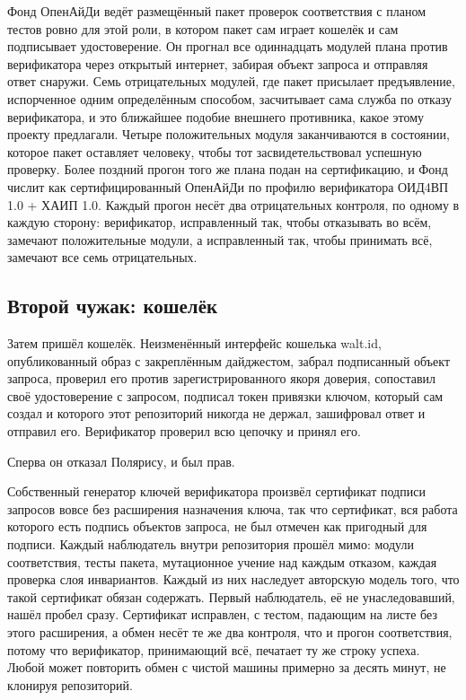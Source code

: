 Фонд ОпенАйДи ведёт размещённый пакет проверок соответствия с планом тестов ровно для этой роли, в
котором пакет сам играет кошелёк и сам подписывает удостоверение. Он прогнал все одиннадцать модулей
плана против верификатора через открытый интернет, забирая объект запроса и отправляя ответ снаружи.
Семь отрицательных модулей, где пакет присылает предъявление, испорченное одним определённым способом,
засчитывает сама служба по отказу верификатора, и это ближайшее подобие внешнего противника, какое
этому проекту предлагали. Четыре положительных модуля заканчиваются в состоянии, которое пакет
оставляет человеку, чтобы тот засвидетельствовал успешную проверку. Более поздний прогон того же плана
подан на сертификацию, и Фонд числит  как сертифицированный ОпенАйДи
по профилю верификатора ОИД4ВП 1.0 + ХАИП 1.0. Каждый прогон несёт два отрицательных контроля, по
одному в каждую сторону: верификатор, исправленный так, чтобы отказывать во всём, замечают
положительные модули, а исправленный так, чтобы принимать всё, замечают все семь отрицательных. \sWit

\subsection{Второй чужак: кошелёк}

Затем пришёл кошелёк. Неизменённый интерфейс кошелька walt.id, опубликованный образ с закреплённым
дайджестом, забрал подписанный объект запроса, проверил его против зарегистрированного якоря доверия,
сопоставил своё удостоверение с запросом, подписал токен привязки ключом, который сам создал и которого
этот репозиторий никогда не держал, зашифровал ответ и отправил его. Верификатор проверил всю цепочку
и принял его.

Сперва он отказал Полярису, и был прав.

Собственный генератор ключей верификатора произвёл сертификат подписи запросов вовсе без расширения
назначения ключа, так что сертификат, вся работа которого есть подпись объектов запроса, не был
отмечен как пригодный для подписи. Каждый наблюдатель внутри репозитория прошёл мимо: модули
соответствия, тесты пакета, мутационное учение над каждым отказом, каждая проверка слоя инвариантов.
Каждый из них наследует авторскую модель того, что такой сертификат обязан содержать. Первый
наблюдатель, её не унаследовавший, нашёл пробел сразу. Сертификат исправлен, с тестом, падающим на
листе без этого расширения, а обмен несёт те же два контроля, что и прогон соответствия, потому что
верификатор, принимающий всё, печатает ту же строку успеха. Любой может повторить обмен с чистой
машины примерно за десять минут, не клонируя репозиторий. \sWit

